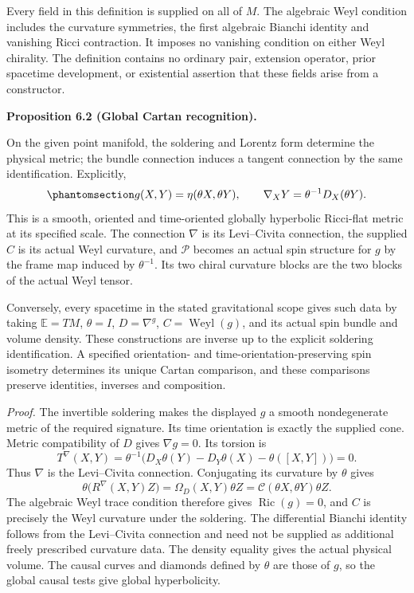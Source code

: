 \documentclass[
  english,
  11pt,
  reqno]{amsart}
\makeatletter
\newcommand{\pandocstatementheading}[1]{%
  \par\if@nobreak\else
    \addpenalty{\@beginparpenalty}%
    \addvspace{.5\baselineskip plus .2\baselineskip minus .2\baselineskip}%
  \fi
  {\normalfont\bfseries #1\par}%
  \nobreak\@afterindenttrue\@afterheading
}
\makeatother
\begin{document}
Every field in this definition is supplied on all of \(M\). The
algebraic Weyl condition includes the curvature symmetries, the first
algebraic Bianchi identity and vanishing Ricci contraction. It imposes
no vanishing condition on either Weyl chirality. The definition contains
no ordinary pair, extension operator, prior spacetime development, or
existential assertion that these fields arise from a constructor.

\pandocstatementheading{\protect{}\label{prop:global-cartan-recognition}Proposition 6.2 (Global Cartan recognition).}

On the given point manifold, the soldering and Lorentz form determine
the physical metric; the bundle connection induces a tangent connection
by the same identification. Explicitly,
\begin{equation}\protect\phantomsection\label{eq:global-cartan-readout}{
g(X,Y)=\eta(\theta X,\theta Y),
\qquad
\nabla_XY=\theta^{-1}D_X(\theta Y).
}\end{equation} This is a smooth, oriented and time-oriented globally
hyperbolic Ricci-flat metric at its specified scale. The connection
\(\nabla\) is its Levi--Civita connection, the supplied \(C\) is its
actual Weyl curvature, and \(\mathcal P\) becomes an actual spin
structure for \(g\) by the frame map induced by \(\theta^{-1}\). Its two
chiral curvature blocks are the two blocks of the actual Weyl tensor.

Conversely, every spacetime in the stated gravitational scope gives such
data by taking \(\mathbb E=TM\), \(\theta=I\), \(D=\nabla^g\),
\(C=\operatorname{Weyl}(g)\), and its actual spin bundle and volume
density. These constructions are inverse up to the explicit soldering
identification. A specified orientation- and time-orientation-preserving
spin isometry determines its unique Cartan comparison, and these
comparisons preserve identities, inverses and composition.

\emph{Proof.} The invertible soldering makes the displayed \(g\) a
smooth nondegenerate metric of the required signature. Its time
orientation is exactly the supplied cone. Metric compatibility of \(D\)
gives \(\nabla g=0\). Its torsion is \[
T^\nabla(X,Y)
=\theta^{-1}\bigl(D_X\theta(Y)-D_Y\theta(X)-\theta([X,Y])\bigr)=0.
\] Thus \(\nabla\) is the Levi--Civita connection. Conjugating its
curvature by \(\theta\) gives \[
\theta\bigl(R^\nabla(X,Y)Z\bigr)
=\Omega_D(X,Y)\theta Z
=\mathcal C(\theta X,\theta Y)\theta Z.
\] The algebraic Weyl trace condition therefore gives
\(\operatorname{Ric}(g)=0\), and \(C\) is precisely the Weyl curvature
under the soldering. The differential Bianchi identity follows from the
Levi--Civita connection and need not be supplied as additional freely
prescribed curvature data. The density equality gives the actual
physical volume. The causal curves and diamonds defined by \(\theta\)
are those of \(g\), so the global causal tests give global
hyperbolicity.
\end{document}
